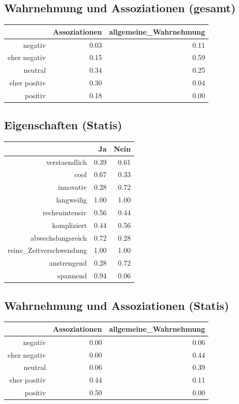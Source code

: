 \documentclass[12pt,a4paper,titlepage=true,parskip,ngerman]{scrartcl}
\begin{document}
\subsection{Wahrnehmung und Assoziationen (gesamt)}
\begin{table}[ht]
\begin{tabular}{rrr}
  \hline
 & Assoziationen & allgemeine\_Wahrnehmung \\ 
  \hline
negativ & 0.03 & 0.11 \\ 
  eher negativ & 0.15 & 0.59 \\ 
  neutral & 0.34 & 0.25 \\ 
  eher positiv & 0.30 & 0.04 \\ 
  positiv & 0.18 & 0.00 \\ 
   \hline
\end{tabular}
\end{table}

\subsection{Eigenschaften (Statis)}
\begin{table}[ht]
\begin{tabular}{rrr}
  \hline
 & Ja & Nein \\ 
  \hline
verstaendlich & 0.39 & 0.61 \\ 
  cool & 0.67 & 0.33 \\ 
  innovativ & 0.28 & 0.72 \\ 
  langweilig & 1.00 & 1.00 \\ 
  rechenintensiv & 0.56 & 0.44 \\ 
  kompliziert & 0.44 & 0.56 \\ 
  abwechslungsreich & 0.72 & 0.28 \\ 
  reine\_Zeitverschwendung & 1.00 & 1.00 \\ 
  anstrengend & 0.28 & 0.72 \\ 
  spannend & 0.94 & 0.06 \\ 
   \hline
\end{tabular}
\end{table}

\newpage
\subsection{Wahrnehmung und Assoziationen (Statis)}
\begin{table}[ht]
\begin{tabular}{rrr}
  \hline
 & Assoziationen & allgemeine\_Wahrnehmung \\ 
  \hline
negativ & 0.00 & 0.06 \\ 
  eher negativ & 0.00 & 0.44 \\ 
  neutral & 0.06 & 0.39 \\ 
  eher positiv & 0.44 & 0.11 \\ 
  positiv & 0.50 & 0.00 \\ 
   \hline
\end{tabular}
\end{table}
\end{document}
